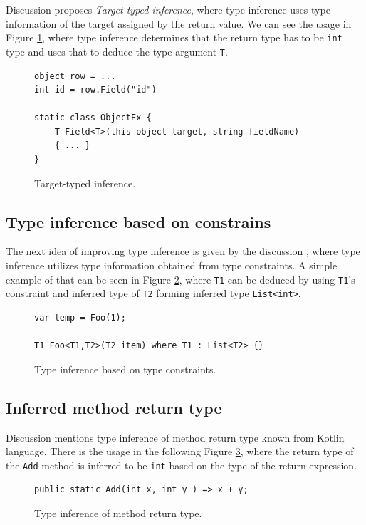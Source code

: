 Discussion \cite{online:RetTInference} proposes \textit{Target-typed inference}, where type inference uses type information of the target assigned by the return value. 
We can see the usage in Figure \ref{img62:RetTInf}, where type inference determines that the return type has to be \texttt{int} type and uses that to deduce the type argument \texttt{T}.
\begin{figure}[h]
\begin{lstlisting}[style=csharp]
object row = ...
int id = row.Field("id")

static class ObjectEx {
	T Field<T>(this object target, string fieldName) 
	{ ... }
}
\end{lstlisting}
\caption{Target-typed inference.}
\label{img62:RetTInf}
\end{figure}

\subsection{Type inference based on constrains}

The next idea of improving type inference is given by the discussion \cite{online:TInfConst}, where type inference utilizes type information obtained from type constraints.
A simple example of that can be seen in Figure \ref{img23:TInfConst}, where \texttt{T1} can be deduced by using \texttt{T1}'s constraint and inferred type of \texttt{T2} forming inferred type \texttt{List<int>}.
\begin{figure}[h!]
\begin{lstlisting}[style=csharp]
var temp = Foo(1);

T1 Foo<T1,T2>(T2 item) where T1 : List<T2> {}
\end{lstlisting}
\caption{Type inference based on type constraints.}
\label{img23:TInfConst}
\end{figure}

\subsection{Inferred method return type}

Discussion \cite{online:TMRetInf} mentions type inference of method return type known from Kotlin language.
There is the usage in the following Figure \ref{img24:TMRetInf}, where the return type of the \texttt{Add} method is inferred to be \texttt{int} based on the type of the return expression.
\begin{figure}[h!]
\begin{lstlisting}[style=csharp]
public static Add(int x, int y ) => x + y;
\end{lstlisting}
\caption{Type inference of method return type.}
\label{img24:TMRetInf}
\end{figure}

